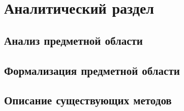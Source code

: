 \section{Аналитический раздел}




\subsection{Анализ предметной области}


\subsection{Формализация предметной области}

\subsection{Описание существующих методов}



